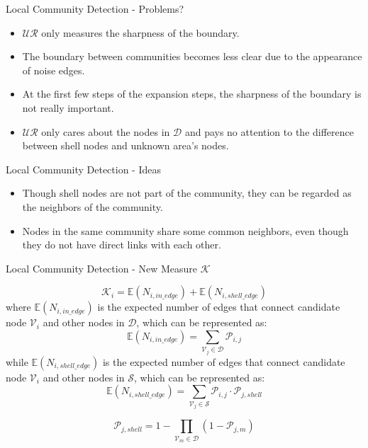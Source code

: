 \documentclass[9pt]{beamer}
\begin{document}
\begin{frame}{Local Community Detection - Problems?}

\begin{itemize}
\item $\mathcal{UR}$ only measures the sharpness of the boundary.
\item The boundary between communities becomes less clear due to the appearance of noise edges.
\item At the first few steps of the expansion steps, the sharpness of the boundary is not really important.
\item $\mathcal{UR}$ only cares about the nodes in $\mathcal{D}$ and pays no attention to the difference between shell nodes and unknown area’s nodes.
\end{itemize}
\end{frame}

\begin{frame}{Local Community Detection - Ideas}

\begin{itemize}
\item Though shell nodes are not part of the community, they can be regarded as the neighbors of the community.
\item Nodes in the same community share some common neighbors, even though they do not have direct links with each other.
\end{itemize}
\end{frame}



\begin{frame}{Local Community Detection - New Measure $\mathcal{K}$}

\begin{equation}
\mathcal{K}_i = \mathbb{E}(N_{i,in\_edge}) + \mathbb{E}(N_{i,shell\_edge})
\end{equation}
where $\mathbb{E}(N_{i,in\_edge})$ is the expected number of edges that connect candidate node $\mathcal{V}_i$ and other nodes in $\mathcal{D}$, which can be represented as:
\begin{equation}
\mathbb{E}(N_{i,in\_edge}) = \sum_{\mathcal{V}_j\in \mathcal{D}}\mathcal{P}_{i,j}
\end{equation}
while $\mathbb{E}(N_{i,shell\_edge})$ is the expected number of edges that connect candidate node $\mathcal{V}_i$ and other nodes in $\mathcal{S}$, which can be represented as:
\begin{equation}
\mathbb{E}(N_{i,shell\_edge}) = \sum_{\mathcal{V}_j\in \mathcal{S}}\mathcal{P}_{i,j}\cdot \mathcal{P}_{j,shell}
\end{equation}

\begin{equation}
\mathcal{P}_{j,shell} = 1-\prod_{\mathcal{V}_m\in \mathcal{D}}(1-\mathcal{P}_{j,m})
\end{equation}

\end{frame}
\end{document}
